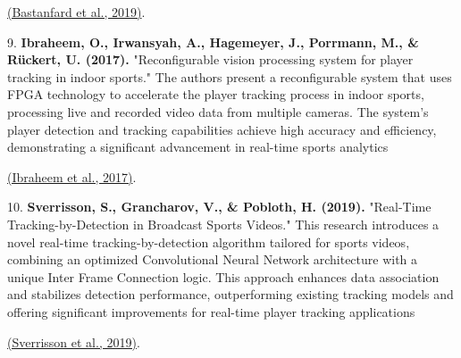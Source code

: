 \documentclass[12pt, letterpaper]{article}
\begin{document}
{\begin{spacing}{1.2}
\href{https://consensus.app/papers/improving-tracking-soccer-players-shaded-playfield-video-bastanfard/e5e9097c3d335d8da4803d4ec8711727/?utm_source=chatgpt}{(Bastanfard et al., 2019)}.

9. \textbf{Ibraheem, O., Irwansyah, A., Hagemeyer, J., Porrmann, M., \& Rückert, U. (2017).} "Reconfigurable vision processing system for player tracking in indoor sports." 
The authors present a reconfigurable system that uses FPGA technology to accelerate the player tracking process in indoor sports, processing live and recorded video data from multiple cameras. The system's player detection and tracking capabilities achieve high accuracy and efficiency, demonstrating a significant advancement in real-time sports analytics

\href{https://consensus.app/papers/vision-processing-system-player-tracking-sports-ibraheem/752c4500b471561bb821a1ec1debfac2/?utm_source=chatgpt}{(Ibraheem et al., 2017)}.

10. \textbf{Sverrisson, S., Grancharov, V., \& Pobloth, H. (2019).} "Real-Time Tracking-by-Detection in Broadcast Sports Videos." 
This research introduces a novel real-time tracking-by-detection algorithm tailored for sports videos, combining an optimized Convolutional Neural Network architecture with a unique Inter Frame Connection logic. This approach enhances data association and stabilizes detection performance, outperforming existing tracking models and offering significant improvements for real-time player tracking applications 

\href{https://consensus.app/papers/realtime-trackingbydetection-broadcast-sports-videos-sverrisson/e07927d4fb4e5c338adf4b97696c541a/?utm_source=chatgpt}{(Sverrisson et al., 2019)}.


\end{spacing}
}
\end{document}
